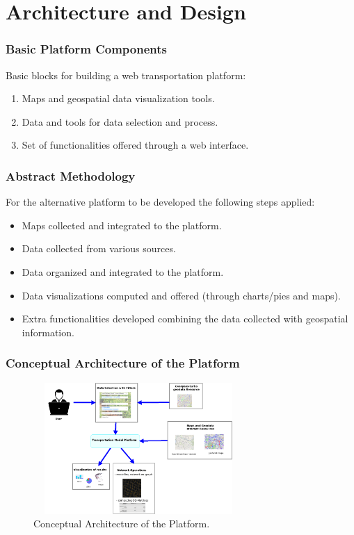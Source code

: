 \documentclass{beamer}
\begin{document}
\section{Architecture and Design}
    \begin{frame}
    \frametitle{Basic Platform Components}
    Basic blocks for building a web transportation platform:
    \begin{enumerate}
        \item Maps and geospatial data visualization tools.
        \item Data and tools for data selection and process.
        \item Set of functionalities offered through a web interface.
    \end{enumerate}
    
	\end{frame}
	
	\begin{frame}
    \frametitle{Abstract Methodology}
    For the alternative platform to be developed the following steps applied:
    
    \begin{itemize}
        \item Maps collected and integrated to the platform.
        \item Data collected from various sources.
        \item Data organized and integrated to the platform.
        \item Data visualizations computed and offered (through charts/pies and maps).
        \item Extra functionalities developed combining the data collected with geospatial information.
    \end{itemize}
    
    \end{frame}
    
    \begin{frame}
    \frametitle{Conceptual Architecture of the Platform}
    \begin{figure}[h]
    \centering
    \includegraphics[width=8cm, height=5cm]{10_conceptual-architecture}
    \caption{Conceptual Architecture of the Platform.}
    \label{fig:arch}
    \end{figure}
    \end{frame}
    
\end{document}
